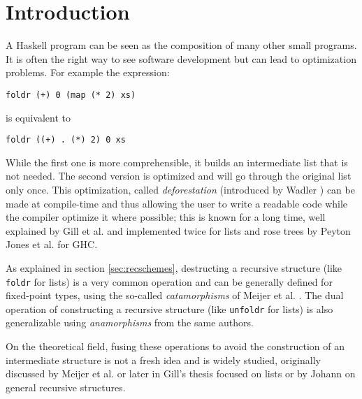 \documentclass[format=sigplan, review=true, anonymous=true]{acmart}
\newcommand{\hs}[1]{\texttt{#1}}
\begin{document}
\section{Introduction}

A Haskell program can be seen as the composition of many other small programs. It is often the right way to see software development but can lead to optimization problems. For example the expression:
\begin{verbatim}
foldr (+) 0 (map (* 2) xs)
\end{verbatim}
is equivalent to
\begin{verbatim}
foldr ((+) . (*) 2) 0 xs
\end{verbatim}

\noindent While the first one is more comprehensible, it builds an intermediate list that is not needed. The second version is optimized and will go through the original list only once.
This optimization, called \emph{deforestation} (introduced by Wadler \cite{WADLER1990231}) can be made at compile-time and thus allowing the user to write a readable code while the compiler optimize it where possible; this is known for a long time, well explained by Gill et al. \cite{Gill:1993:SCD:165180.165214} and implemented twice for lists and rose trees by Peyton Jones et al. \cite{pbr} for GHC.

As explained in section \ref{sec:recschemes}, destructing a recursive structure (like \hs{foldr} for lists) is a very common operation and can be generally defined for fixed-point types, using the so-called \emph{catamorphisms} of Meijer et al. \cite{4cec4a43c86444479dc0003182424795}. The dual operation of constructing a recursive structure (like \hs{unfoldr} for lists) is also generalizable using \emph{anamorphisms} from the same authors.

On the theoretical field, fusing these operations to avoid the construction of an intermediate structure is not a fresh idea and is widely studied, originally discussed by Meijer et al. \cite{4cec4a43c86444479dc0003182424795} or later in Gill's thesis \cite{Gill1996CheapDF} focused on lists or by Johann \cite{Johann:2002:GSF:641433.641471} on general recursive structures.
\end{document}

